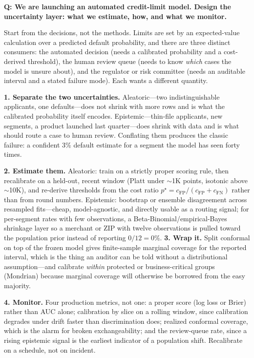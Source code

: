 \begin{interviewq}
\textbf{Q: We are launching an automated credit-limit model. Design the uncertainty layer: what we estimate, how, and what we monitor.}

 \quad {} \quad \badgefreq{\freqmed}

\stronganswer

Start from the decisions, not the methods. Limits are set by an expected-value calculation over a predicted default probability, and there are three distinct consumers: the automated decision (needs a calibrated probability and a cost-derived threshold), the human review queue (needs to know \textit{which} cases the model is unsure about), and the regulator or risk committee (needs an auditable interval and a stated failure mode). Each wants a different quantity.

\textbf{1. Separate the two uncertainties.} Aleatoric---two indistinguishable applicants, one defaults---does not shrink with more rows and is what the calibrated probability itself encodes. Epistemic---thin-file applicants, new segments, a product launched last quarter---does shrink with data and is what should route a case to human review. Conflating them produces the classic failure: a confident 3\% default estimate for a segment the model has seen forty times.

\textbf{2. Estimate them.} Aleatoric: train on a strictly proper scoring rule, then recalibrate on a held-out, recent window (Platt under $\sim$1K points, isotonic above $\sim$10K), and re-derive thresholds from the cost ratio $p^\star = c_{\text{FP}}/(c_{\text{FP}}+c_{\text{FN}})$ rather than from round numbers. Epistemic: bootstrap or ensemble disagreement across resampled fits---cheap, model-agnostic, and directly usable as a routing signal; for per-segment rates with few observations, a Beta-Binomial/empirical-Bayes shrinkage layer so a merchant or ZIP with twelve observations is pulled toward the population prior instead of reporting $0/12 = 0\%$. \textbf{3. Wrap it.} Split conformal on top of the frozen model gives finite-sample marginal coverage for the reported interval, which is the thing an auditor can be told without a distributional assumption---and calibrate \textit{within} protected or business-critical groups (Mondrian) because marginal coverage will otherwise be borrowed from the easy majority.

\textbf{4. Monitor.} Four production metrics, not one: a proper score (log loss or Brier) rather than AUC alone; calibration by slice on a rolling window, since calibration degrades under drift faster than discrimination does; realized conformal coverage, which is the alarm for broken exchangeability; and the review-queue rate, since a rising epistemic signal is the earliest indicator of a population shift. Recalibrate on a schedule, not on incident.


\end{interviewq}
